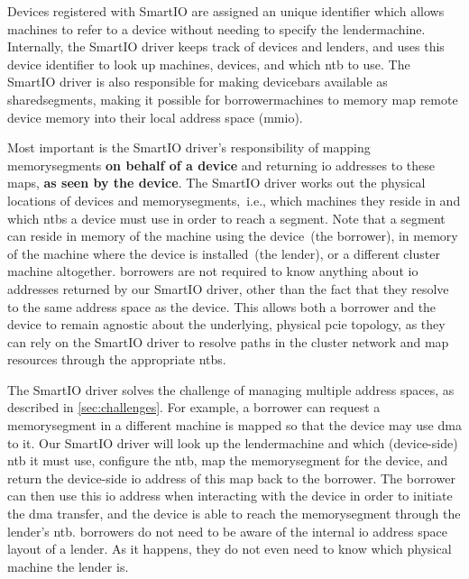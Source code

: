 Devices registered with SmartIO are assigned an unique identifier which allows machines to refer to a device without needing to specify the \gls{lendermachine}.
%
Internally, the SmartIO driver keeps track of devices and \glspl{lender}, and uses this device identifier to look up machines, devices, and which \gls{ntb} to use.
%
The SmartIO driver is also responsible for making \glspl{devicebar} available as \glspl{sharedsegment}, making it possible for \glspl{borrowermachine} to memory map remote device memory into their local address space (\gls{mmio}).



Most important is the SmartIO driver's responsibility of mapping \glspl{memorysegment} \textbf{on behalf of a device} and returning \gls{io} addresses to these maps, \textbf{as seen by the device}.
%
The SmartIO driver works out the physical locations of devices and \glspl{memorysegment},~i.e., which machines they reside in and which \glspl{ntb} a device must use in order to reach a \gls{segment}.
%
Note that a \gls{segment} can reside in memory of the machine using the device~(the \gls{borrower}), in memory of the machine where the device is installed~(the \gls{lender}), or a different cluster machine altogether.
%
\Glspl{borrower} are not required to know anything about \gls{io} addresses returned by our SmartIO driver, other than the fact that they resolve to the same address space as the device.
%
This allows both a \gls{borrower} and the device to remain agnostic about the underlying, physical \gls{pcie} topology, as they can rely on the SmartIO driver to resolve paths in the cluster network and map resources through the appropriate \glspl{ntb}.



The SmartIO driver solves the challenge of managing multiple address spaces, as described in \cref{sec:challenges}.
%
For example, a \gls{borrower} can request a \gls{memorysegment} in a different machine is mapped so that the device may use \gls{dma} to it.
%
Our SmartIO driver will look up the \gls{lendermachine} and which (device-side) \gls{ntb} it must use, configure the \gls{ntb}, map the \gls{memorysegment} for the device, and return the device-side \gls{io} address of this map back to the \gls{borrower}.
%
The \gls{borrower} can then use this \gls{io} address when interacting with the device in order to initiate the \gls{dma} transfer, and the device is able to reach the \gls{memorysegment} through the lender's \gls{ntb}.
%
\Glspl{borrower} do not need to be aware of the internal \gls{io} address space layout of a \gls{lender}.
%
As it happens, they do not even need to know which physical machine the \gls{lender} is.



